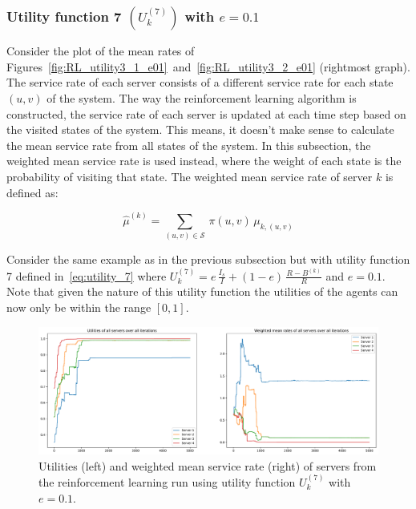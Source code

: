 \subsubsection{Utility function 7 \((U_k^{(7)})\) with \(e = 0.1\)}
\label{sec:utility_7_01_results}

Consider the plot of the mean rates of
Figures~\ref{fig:RL_utility3_1_e01}~and~\ref{fig:RL_utility3_2_e01}
(rightmost graph).
The service rate of each server consists of a different service rate for each
state \((u, v)\) of the system.
The way the reinforcement learning algorithm is constructed, the service rate
of each server is updated at each time step based on the visited states of the
system.
This means, it doesn't make sense to calculate the mean service rate from all
states of the system.
In this subsection, the weighted mean service rate is used instead, where
the weight of each state is the probability of visiting that state.
The weighted mean service rate of server \(k\) is defined as:

\begin{equation}
    \hat{\mu}^{(k)} = \sum_{(u, v) \in \mathcal{S}} \,
    \pi(u, v) \, \mu_{k, (u, v)}
\end{equation}

Consider the same example as in the previous subsection but with utility
function 7 defined in~\eqref{eq:utility_7} where
\(U_k^{(7)} = e \, \frac{I_s}{I} + (1 - e) \, \frac{R - B^{(k)}}{R}\) and
\(e = 0.1\).
Note that given the nature of this utility function the utilities of the agents
can now only be within the range \([0, 1]\).

\begin{figure}[H]
    \includegraphics[width=\textwidth]{chapters/06_agent_based_extension/Bin/reinforcement_learning_results/utility_7/u7_4_e01.pdf}
    \caption{Utilities (left) and weighted mean service rate (right) of servers
    from the reinforcement learning run using utility function \(U_k^{(7)}\)
    with \(e = 0.1\).}
    \label{fig:RL_utility7_4_e01}
\end{figure}


